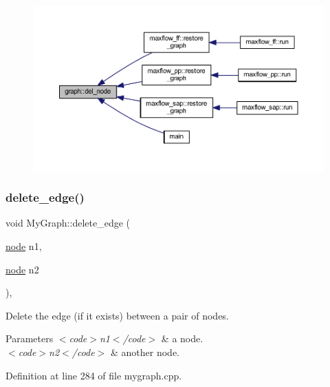 \begin{figure}[H]
\begin{center}
\leavevmode
\includegraphics[width=350pt]{classgraph_a8bdc09d5b9ac4bd26586b054d8fcbe91_icgraph}
\end{center}
\end{figure}
\mbox{\label{class_my_graph_a4070383c56ef8f54e9fdc595d65b89de}} 
\subsubsection{\texorpdfstring{delete\+\_\+edge()}{delete\_edge()}}
{\footnotesize\ttfamily void My\+Graph\+::delete\+\_\+edge (\begin{DoxyParamCaption}\item[{\mbox{\hyperlink{classnode}{node}}}]{n1,  }\item[{\mbox{\hyperlink{classnode}{node}}}]{n2 }\end{DoxyParamCaption})\hspace{0.3cm}{\ttfamily [virtual]}, {\ttfamily [inherited]}}

Delete the edge (if it exists) between a pair of nodes.


\begin{DoxyParams}{Parameters}
{\em $<$code$>$n1$<$/code$>$} & a node. \\
\hline
{\em $<$code$>$n2$<$/code$>$} & another node. \\
\hline
\end{DoxyParams}


Definition at line 284 of file mygraph.\+cpp.


